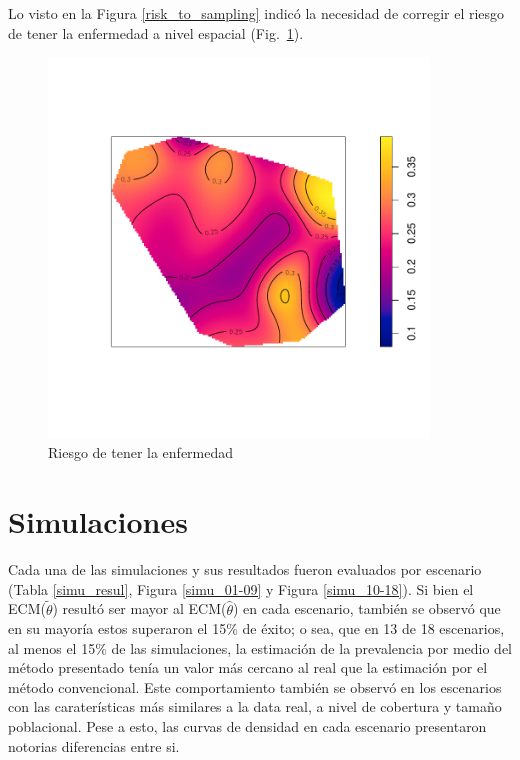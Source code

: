 \newpage

Lo visto en la Figura \ref{risk_to_sampling} indicó la necesidad de corregir el riesgo de tener la enfermedad a nivel espacial (Fig.~\ref{risk_to_disease}).
\begin{figure}[h]
	\centering
	\includegraphics[width=0.9\textwidth]{graficos/risk_to_disease.pdf}
	\caption{Riesgo de tener la enfermedad}
	\label{risk_to_disease}
\end{figure}

\newpage

\section{Simulaciones}

Cada una de las simulaciones y sus resultados fueron evaluados por escenario (Tabla \ref{simu_resul}, Figura \ref{simu_01-09} y Figura \ref{simu_10-18}). Si bien el ECM($\tilde{\theta}$) resultó ser mayor al ECM($\hat{\theta}$) en cada escenario, también se observó que en su mayoría estos superaron el 15\% de éxito; o sea, que en 13 de 18 escenarios, al menos el 15\% de las simulaciones, la estimación de la prevalencia por medio del método presentado tenía un valor más cercano al real que la estimación por el método convencional. Este comportamiento también se observó en los escenarios con las caraterísticas más similares a la data real, a nivel de cobertura y tamaño poblacional. Pese a esto, las curvas de densidad en cada escenario presentaron notorias diferencias entre si.


